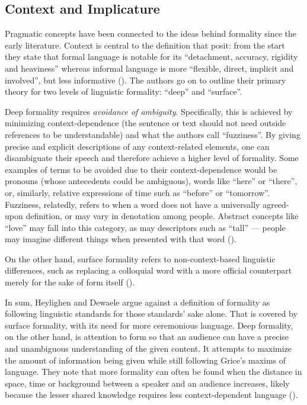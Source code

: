\subsection{Context and Implicature}

Pragmatic concepts have been connected to the ideas behind formality since the early literature. Context is central to the definition that \cite{heylighen1999formality} posit: from the start they state that formal language is notable for its ``detachment, accuracy, rigidity and heaviness'' whereas informal language is more ``flexible, direct, implicit and involved'', but less informative (\cite{heylighen1999formality}). The authors go on to outline their primary theory for two levels of linguistic formality: ``deep'' and ``surface''.

Deep formality requires \textit{avoidance of ambiguity}. Specifically, this is achieved by minimizing context-dependence (the sentence or text should not need outside references to be understandable) and what the authors call ``fuzziness''. By giving precise and explicit descriptions of any context-related elements, one can disambiguate their speech and therefore achieve a higher level of formality. Some examples of terms to be avoided due to their context-dependence would be pronouns (whose antecedents could be ambiguous), words like ``here'' or ``there'', or, similarly, relative expressions of time such as ``before'' or ``tomorrow''. Fuzziness, relatedly, refers to when a word does not have a universally agreed-upon definition, or may vary in denotation among people. Abstract concepts like ``love'' may fall into this category, as may descriptors such as ``tall'' --- people may imagine different things when presented with that word (\cite{heylighen1999formality}). 

On the other hand, surface formality refers to non-context-based linguistic differences, such as replacing a colloquial word with a more official counterpart merely for the sake of form itself (\cite{heylighen1999formality}).

In sum, Heylighen and Dewaele argue against a definition of formality as following linguistic standards for those standards' sake alone. That is covered by surface formality, with its need for more ceremonious language. Deep formality, on the other hand, is attention to form so that an audience can have a precise and unambiguous understanding of the given content. It attempts to maximize the amount of information being given while still following Grice's maxims of language. They note that more formality can often be found when the distance in space, time or background between a speaker and an audience increases, likely because the lesser shared knowledge requires less context-dependent language (\cite{heylighen1999formality}).


